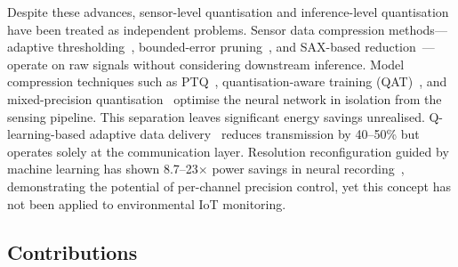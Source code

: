 Despite these advances, sensor-level quantisation and inference-level quantisation have been treated as independent problems. Sensor data compression methods---adaptive thresholding~\cite{atitallah2023autonomous}, bounded-error pruning~\cite{azar2020bounded}, and SAX-based reduction~\cite{aljanabi2022sax}---operate on raw signals without considering downstream inference. Model compression techniques such as PTQ~\cite{smoothquant2024}, quantisation-aware training (QAT)~\cite{edgeqat2024, efficientqat2024}, and mixed-precision quantisation~\cite{dong2024efficient, dybit2023} optimise the neural network in isolation from the sensing pipeline. This separation leaves significant energy savings unrealised. Q-learning-based adaptive data delivery~\cite{qlearning2025airquality} reduces transmission by 40--50\% but operates solely at the communication layer. Resolution reconfiguration guided by machine learning has shown 8.7--23$\times$ power savings in neural recording~\cite{pandey2025neural}, demonstrating the potential of per-channel precision control, yet this concept has not been applied to environmental IoT monitoring.

\subsection{Contributions}
\label{sec:intro_contributions}

